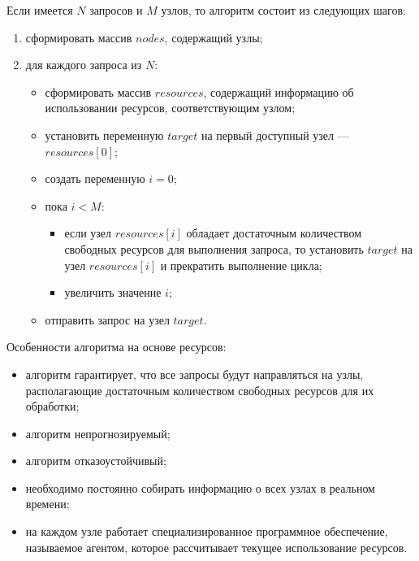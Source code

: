 Если имеется $N$ запросов и $M$ узлов, то алгоритм состоит из следующих шагов:
\begin{enumerate}
	\item сформировать массив $nodes$, содержащий узлы;
	\item для каждого запроса из $N$:
	\begin{itemize}
		\item сформировать массив $resources$, содержащий информацию об использовании ресурсов, соответствующим узлом;
		\item установить переменную $target$ на первый доступный узел --- $resources[0]$;
		\item создать переменную $i = 0$;
		\item пока $i < M$:
		\begin{itemize}
			\item если узел $resources[i]$ обладает достаточным количеством свободных ресурсов для выполнения запроса, то установить $target$ на узел $resources[i]$ и  прекратить выполнение цикла;
			\item увеличить значение $i$;
		\end{itemize}
		\item отправить запрос на узел $target$.
	\end{itemize}
\end{enumerate}

Особенности алгоритма на основе ресурсов:
\begin{itemize}
	\item алгоритм гарантирует, что все запросы будут направляться на узлы, располагающие достаточным количеством свободных ресурсов для их обработки;
    \item алгоритм непрогнозируемый;
    \item алгоритм отказоустойчивый;
    \item необходимо постоянно собирать информацию о всех узлах в реальном времени;
    \item на каждом узле работает специализированное программное обеспечение, называемое агентом, которое рассчитывает текущее использование ресурсов.
\end{itemize}
